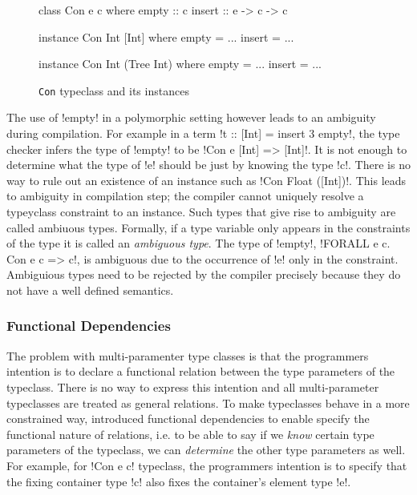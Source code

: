 \documentclass[manuscript,screen,nonacm]{acmart}
\begin{document}
\begin{figure}[ht]
\centering
\begin{minipage}[ht]{0.3\linewidth}
\begin{code}
class Con e c where
  empty :: c
  insert :: e -> c -> c
\end{code}
\end{minipage}%
\begin{minipage}[ht]{0.3\linewidth}
\begin{code}
instance Con Int [Int] where
  empty = ...
  insert = ...
\end{code}
\end{minipage}%
\begin{minipage}[ht]{0.3\linewidth}
\begin{code}
instance Con Int (Tree Int) where
  empty = ...
  insert = ...
\end{code}
\end{minipage}
\caption[Con typeclass]{\lstinline{Con} typeclass and its instances}
\label{fig:tc-collection}
\end{figure}

The use of !empty! in a polymorphic setting however leads to an ambiguity during compilation. For example in a term !t :: [Int] = insert 3 empty!, the type checker infers the type of !empty! to be !Con e [Int] => [Int]!. It is not enough to determine what the type of !e! should be just by knowing the type !c!. There is no way to rule out an existence of an instance such as !Con Float ([Int])!. This leads to ambiguity in compilation step; the compiler cannot uniquely resolve a typeyclass constraint to an instance. Such types that give rise to ambiguity are called ambiuous types. Formally, if a type variable only appears in the constraints of the type it is called an \emph{ambiguous type}. The type of !empty!, !FORALL e c. Con e c => c!, is ambiguous due to the occurrence of !e! only in the constraint. Ambiguious types need to be rejected by the compiler precisely because they do not have a well defined semantics. %

\subsubsection{Functional Dependencies}
The problem with multi-paramenter type classes is that the programmers intention is to declare a functional relation between the type parameters of the typeclass. There is no way to express this intention and all multi-parameter typeclasses are treated as general relations. To make typeclasses behave in a more constrained way, \citet{jones_tcfd_2000} introduced functional dependencies to enable specify the functional nature of relations, i.e. to be able to say if we \emph{know} certain type parameters of the typeclass, we can \emph{determine} the other type parameters as well. For example, for !Con e c! typeclass, the programmers intention is to specify that the fixing container type !c! also fixes the container's element type !e!.
\end{document}
